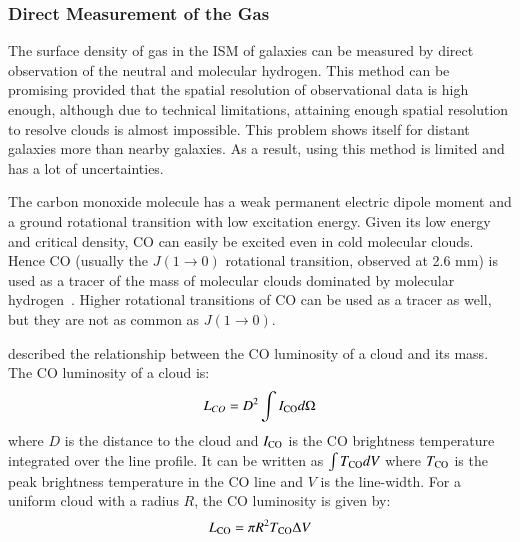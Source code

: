 \subsubsection{Direct Measurement of the Gas}

The surface density of gas in the ISM of galaxies can be measured by direct observation of the neutral and molecular hydrogen.
This method can be promising provided that the spatial resolution of observational data is high enough, although due to technical limitations, attaining enough spatial resolution to resolve clouds is almost impossible. This problem shows itself for distant galaxies more than nearby galaxies. 
As a result, using this method is limited and has a lot of uncertainties. %
 
The carbon monoxide molecule has a weak permanent electric dipole moment and a ground rotational transition with low excitation energy. 
Given its low energy and critical density, CO can easily be excited even in cold molecular clouds.
Hence CO (usually the $J(1\rightarrow 0)$ rotational transition, observed at 2.6 mm) is used as a tracer of the mass of molecular clouds dominated by molecular hydrogen~\citep[e.g.][] {Sanders84}.
Higher rotational transitions of CO can be used as a tracer as well, but they are not as common as $J(1\rightarrow 0)$.

\cite{Young91} described the relationship between the CO luminosity of a cloud and its mass. The CO luminosity of a cloud is:
\begin{equation}
L_{CO} = D^2 \int I_{\rm CO} d\Omega 
\end{equation}
where $D$ is the distance to the cloud and 
$I_{\rm CO}$ is the CO brightness temperature integrated over the line profile.
It can be written as ${\int T_{\rm CO} dV}$ where $T_{\rm CO}$ is the peak brightness temperature in the CO line and $V$ is the line-width. %
For a uniform cloud with a radius $R$, the CO luminosity is given by:
 \begin{equation}
L_{\rm CO} = \pi R^2 T_{\rm CO} \Delta V
\end{equation}

